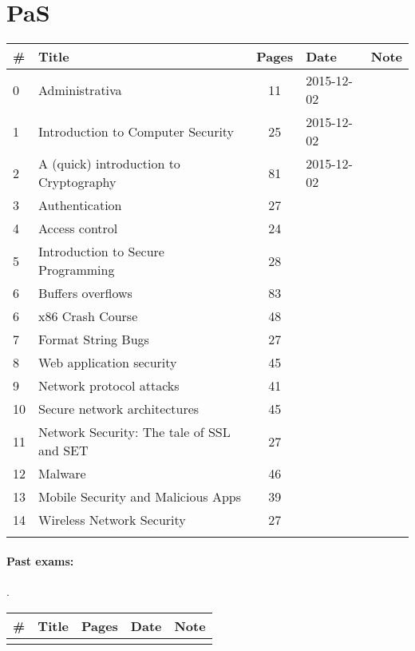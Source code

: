 \documentclass[a4paper,12pt]{article} %
\begin{document}
\section{PaS}
\begin{tabularx}{\textwidth}{|l|X|c|l|c|}
	\hline
	\# & Title & Pages & Date & Note \\
	\hline
	0 & Administrativa & 11 & 2015-12-02 &  \\
	\hline
	1 & Introduction to Computer Security & 25 & 2015-12-02 &  \\
	\hline
	2 & A (quick) introduction to Cryptography & 81 & 2015-12-02 &  \\
	\hline
	3 & Authentication & 27 &  &  \\
	\hline
	4 & Access control & 24 &  &  \\
	\hline
	5 & Introduction to Secure Programming & 28 &  &  \\
	\hline
	6 & Buffers overflows & 83 &  &  \\
	\hline
	6 & x86 Crash Course & 48 &  &  \\
	\hline
	7 & Format String Bugs & 27 &  &  \\
	\hline
	8 & Web application security & 45 &  &  \\
	\hline
	9 & Network protocol attacks & 41 &  &  \\
	\hline
	10 & Secure network architectures & 45 &  &  \\
	\hline
	11 & Network Security: The tale of SSL and SET & 27 &  &  \\
	\hline
	12 & Malware & 46 &  &  \\
	\hline
	13 & Mobile Security and Malicious Apps & 39 &  &  \\
	\hline
	14 & Wireless Network Security & 27 &  &  \\
	\hline
	&  &  &  &  \\
	\hline
\end{tabularx}

\paragraph{Past exams:}.\\
\begin{tabularx}{\textwidth}{|l|X|c|l|c|}
	\hline
	\# & Title & Pages & Date & Note \\
	\hline
	&  &  &  &  \\
	\hline
\end{tabularx}

\newpage
\end{document}
